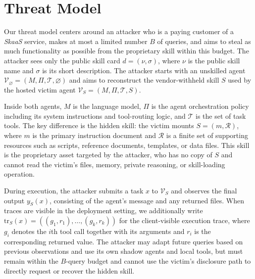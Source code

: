 \documentclass[letterpaper,twocolumn,10pt]{article}
\newcommand{\trace}{\mathrm{tr}}
\begin{document}

\section{Threat Model}
\label{sec:threat-model}

Our threat model centers around an attacker who is a paying customer of a \textit{SkaaS} service, makes at most a limited number $B$ of queries, and aims to steal as much functionality as possible from the proprietary skill within this budget. The attacker sees only the public skill card $d=(\nu,\sigma)$, where $\nu$ is the public skill name and $\sigma$ is its short description. The attacker starts with an unskilled agent $\mathcal{V}_{\varnothing}=(M,\Pi,\mathcal{T},\varnothing)$ and aims to reconstruct the vendor-withheld skill $S$ used by the hosted victim agent $\mathcal{V}_{S}=(M,\Pi,\mathcal{T},S)$.

Inside both agents, $M$ is the language model, $\Pi$ is the agent orchestration policy including its system instructions and tool-routing logic, and $\mathcal{T}$ is the set of task tools. The key difference is the hidden skill: the victim mounts $S=(m,\mathcal{R})$, where $m$ is the primary instruction document and $\mathcal{R}$ is a finite set of supporting resources such as scripts, reference documents, templates, or data files. This skill is the proprietary asset targeted by the attacker, who has no copy of $S$ and cannot read the victim’s files, memory, private reasoning, or skill-loading operation.

During execution, the attacker submits a task $x$ to $\mathcal{V}_{S}$ and observes the final output $y_S(x)$, consisting of the agent’s message and any returned files. When traces are visible in the deployment setting, we additionally write $\trace_S(x)=((g_1,r_1),\ldots,(g_k,r_k))$ for the client-visible execution trace, where $g_i$ denotes the $i$th tool call together with its arguments and $r_i$ is the corresponding returned value. The attacker may adapt future queries based on previous observations and use its own shadow agents and local tools, but must remain within the $B$-query budget and cannot use the victim’s disclosure path to directly request or recover the hidden skill.
\end{document}

